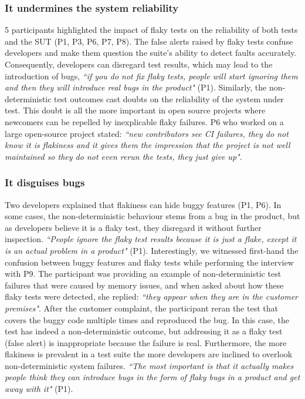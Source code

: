 \subsubsection{\textbf{It undermines the system reliability}}
5 participants highlighted the impact of flaky tests on the reliability of both tests and the SUT (P1, P3, P6, P7, P8).
The false alerts raised by flaky tests confuse developers and make them question the suite's ability to detect faults accurately.
Consequently, developers can disregard test results, which may lead to the introduction of bugs, \textit{``if you do not fix flaky tests, people will start ignoring them and then they will introduce real bugs in the product"} (P1).
Similarly, the non-deterministic test outcomes cast doubts on the reliability of the system under test.
This doubt is all the more important in open source projects where newcomers can be repelled by inexplicable flaky failures.
P6 who worked on a large open-source project stated: \textit{``new contributors see CI failures, they do not know it is flakiness and it gives them the impression that the project is not well maintained so they do not even rerun the tests, they just give up"}. 


\subsubsection{\textbf{It disguises bugs}}
Two developers explained that flakiness can hide buggy features (P1, P6).
In some cases, the non-deterministic behaviour stems from a bug in the product, but as developers believe it is a flaky test, they disregard it without further inspection.
\textit{``People ignore the flaky test results because it is just a flake, except it is an actual problem in a product"} (P1).
Interestingly, we witnessed first-hand the confusion between buggy features and flaky tests while performing the interview with P9.
The participant was providing an example of non-deterministic test failures that were caused by memory issues, and when asked about how these flaky tests were detected, she replied: \textit{``they appear when they are in the customer premises"}.
After the customer complaint, the participant reran the test that covers the buggy code multiple times and reproduced the bug.
In this case, the test has indeed a non-deterministic outcome, but addressing it as a flaky test (false alert) is inappropriate because the failure is real.
Furthermore, the more flakiness is prevalent in a test suite the more developers are inclined to overlook non-deterministic system failures.
\textit{``The most important is that it actually makes people think they can introduce bugs in the form of flaky bugs in a product and get away with it"} (P1).

